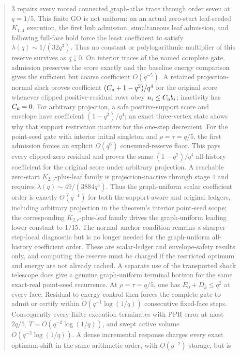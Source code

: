 \documentclass[11pt]{article}
\begin{document}
\begin{abstract}
$3$ repairs every rooted connected graph-atlas trace through order seven at
$q=1/5$.  This finite GO is not uniform: on an actual zero-start leaf-seeded
$K_{1,4}$ execution, the first hub admission, simultaneous leaf admission,
and following full-face hold force the least coefficient to satisfy
$\lambda(q)\sim1/(32q^3)$.  Thus no constant or polylogarithmic multiplier of
this reserve survives as $q\downarrow0$.  On interior traces of the named
complete gate, admission preserves the score exactly and the baseline energy
comparison gives the sufficient but coarse coefficient
$O(q^{-5})$.  A retained projection-normal slack proves coefficient
$(C_{\rm n}+1-q^2)/q^4$ for the original score whenever clipped
positive-residual rows obey $n_i\leq C_{\rm n}b_i$; inactivity has
$C_{\rm n}=0$.  For arbitrary projection, a safe
positive-support score and envelope have coefficient $(1-q^2)/q^4$; an exact
three-vertex state shows why that support restriction matters for the
one-step decrement.  For the point-seed gate with interior initial singleton
and $\rho=\tau=q/5$, the first admission forces an explicit $\Omega(q^6)$
consumed-reserve floor.  This pays
every clipped-zero residual and proves the same $(1-q^2)/q^4$ all-history
coefficient for the original score under arbitrary projection.  A reachable
zero-start $K_{2,3}$-plus-leaf family is
projection-inactive through stage $4$ and requires
$\lambda(q)\sim49/(3884q^4)$.  Thus the graph-uniform scalar coefficient order
is exactly $\Theta(q^{-4})$ for both the support-aware and original ledgers,
including arbitrary projection in the theorem's interior point-seed scope; the corresponding
$K_{2,r}$-plus-leaf family drives the graph-uniform leading lower constant to
$1/15$.  The normal--anchor condition remains a sharper step-local diagnostic
but is no longer needed for the graph-uniform all-history coefficient order.
These are
scalar-ledger and envelope-safety results only,
and computing the reserve must be charged if the restricted optimum and
energy are not already cached.  A separate use of the transported shock
telescope does give a genuine graph-uniform terminal horizon for the same
exact-real point-seed recurrence.  At $\rho=\tau=q/5$, one has
$E_0+D_k\leq q^2$ at every face.  Residual-to-energy control then forces the
complete gate to admit or certify within
$O(q^{-1}\log(1/q))$ consecutive fixed-face steps.  Consequently every
finite execution terminates with PPR error at most $2q/5$,
$T=O(q^{-2}\log(1/q))$, and swept active volume
$O(q^{-3}\log(1/q))$.  A dense incremental response charges every exact
optimum shift in the same arithmetic order, with $O(q^{-2})$ storage, but is

\end{abstract}
\end{document}
